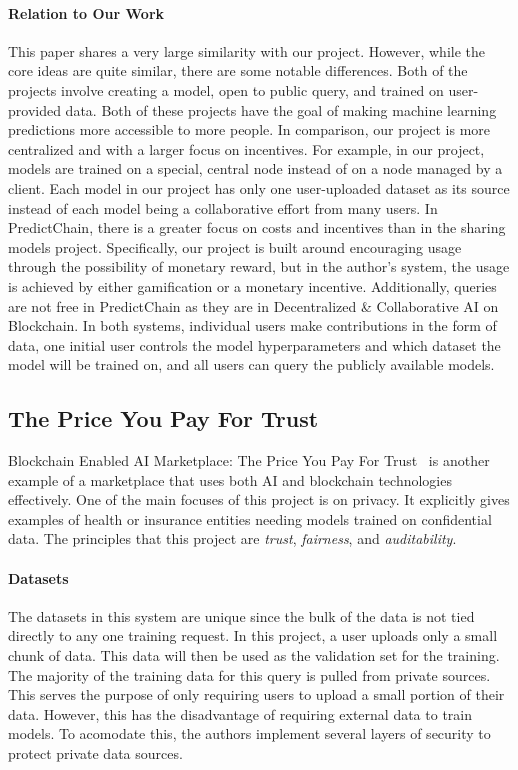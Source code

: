 \documentclass{article}
\begin{document}
    \paragraph{Relation to Our Work}
    This paper shares a very large similarity with our project.  However, while the core ideas are quite similar, there
    are some notable differences.  Both of the projects involve creating a model, open to public query, and trained on
    user-provided data.  Both of these projects have the goal of making machine learning predictions more accessible
    to more people.  In comparison, our project is more centralized and with a larger focus on incentives.  For
    example, in our project, models are trained on a special, central node instead of on a node managed by a client.
    Each model in our project has only one user-uploaded dataset as its source instead of each model being a collaborative
    effort from many users.  In PredictChain, there is a greater focus on costs and incentives than in the sharing models
    project.  Specifically, our project is built around encouraging usage through the possibility of monetary reward,
    but in the author's system, the usage is achieved by either gamification or a monetary incentive.  Additionally,
    queries are not free in PredictChain as they are in Decentralized \& Collaborative AI on Blockchain.  In both systems,
    individual users make contributions in the form of data, one initial user controls the model hyperparameters and
    which dataset the model will be trained on, and all users can query the publicly available models.

    \subsection{The Price You Pay For Trust}

    Blockchain Enabled AI Marketplace: The Price You Pay For Trust~\cite{priceOfTrust} is another example of a marketplace
    that uses both AI and blockchain technologies effectively.  One of the main focuses of this project is on privacy.
    It explicitly gives examples of health or insurance entities needing models trained on confidential data.  The principles
    that this project are \textit{trust}, \textit{fairness}, and \textit{auditability}.

    \paragraph{Datasets}
    The datasets in this system are unique since the bulk of the data is not tied directly to any one training request.
    In this project, a user uploads only a small chunk of data.  This data will then be used as the validation set for
    the training.  The majority of the training data for this query is pulled from private sources.  This serves the purpose
    of only requiring users to upload a small portion of their data.  However, this has the disadvantage of requiring
    external data to train models.  To acomodate this, the authors implement several layers of security to protect private
    data sources.
\end{document}
